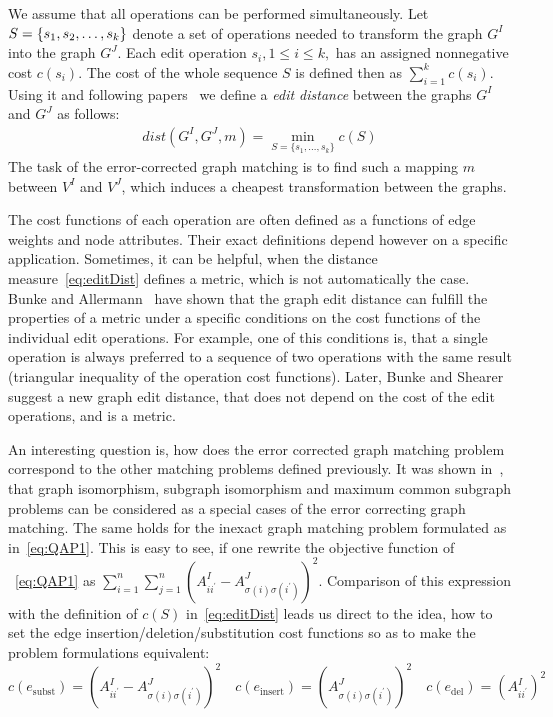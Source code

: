 We assume that all operations can be performed simultaneously. Let $S=\{s_1,s_2,\dots,\newline s_k\}$ denote a set of operations needed to transform the graph $G^I$ into the graph $G^J$. 
Each edit operation $s_i, 1\le i\le k,$ has an assigned nonnegative cost $c(s_i)$. The cost of the whole sequence $S$ is defined then as $\sum_{i=1}^{k}c(s_i)$. Using it and following papers~\cite{Bunke1983_inexactGM, Wang1995} we define a \emph{edit distance} between the graphs $G^I$ and $G^J$ as follows:
\begin{eqnarray} \label{eq:editDist}
dist(G^I,G^J,m) = \min\limits_{S=\{s_1,\dots,s_k\}}c(S)
\end{eqnarray}
The task of the error-corrected graph matching is to find such a mapping $m$ between $V^I$ and $V^J$, which induces a cheapest transformation between the graphs.

The cost functions of each operation are often defined as a functions of edge weights and node attributes. Their exact definitions depend however on a specific application. Sometimes, it can be helpful, when the distance measure~\eqref{eq:editDist} defines a metric, which is not automatically the case. Bunke and Allermann~\cite{Bunke1983_inexactGM} have shown that the graph edit distance can fulfill the properties of a metric under a specific conditions on the cost functions of the individual edit operations. For example, one of this conditions is, that a single operation is always preferred to a sequence of two operations with the same result (triangular inequality of the operation cost functions). Later, Bunke and Shearer~\cite{Bunke1998_graphDist} suggest a new graph edit distance, that does not depend on the cost of the edit operations, and is a metric.

An interesting question is, how does the error corrected graph matching problem correspond to the other matching problems defined previously. It was shown in~\cite{Bunke1999_UnderlyingCosts}, that graph isomorphism, subgraph isomorphism and maximum common subgraph problems can be considered as a special cases of the error correcting graph matching. The same holds for the inexact graph matching problem formulated as in~\eqref{eq:QAP1}. This is easy to see, if one rewrite the objective function of ~\eqref{eq:QAP1} as $\sum_{i=1}^n\sum_{j=1}^{n}(A^I_{ii^\prime}-A^J_{\sigma(i)\sigma(i^\prime)})^2$. Comparison of this expression with the definition of $c(S)$ in~\eqref{eq:editDist} leads us direct to the idea, how to set the edge insertion/deletion/substitution cost functions so as to make the problem formulations equivalent: 
\begin{equation*}
c(e_{\text{subst}})=(A^I_{ii^\prime}-A^J_{\sigma(i)\sigma(i^\prime)})^2\quad c(e_{\text{insert}})=(A^J_{\sigma(i)\sigma(i^\prime)})^2\quad c(e_{\text{del}})=(A^I_{ii^\prime})^2
\end{equation*}
